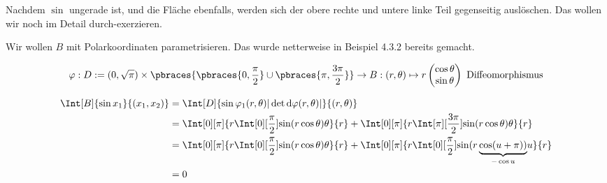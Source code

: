 \begin{solution}
\begin{enumerate}[label = \arabic*.]
\begin{center}
    \end{center}

    Nachdem $\sin$ ungerade ist, und die Fläche ebenfalls, werden sich der obere rechte und untere linke Teil gegenseitig auslöschen.
    Das wollen wir noch im Detail durch-exerzieren.


    Wir wollen $B$ mit Polarkoordinaten parametrisieren.
    Das wurde netterweise in Beispiel 4.3.2 bereits gemacht.

    \begin{align*}
        \varphi:
        D
        :=
        (0, \sqrt \pi)
        \times
        \pbraces
        {
            \pbraces
            {
                0,
                \frac{\pi}{2}
            }
            \cup
            \pbraces
            {
                \pi,
                \frac{3 \pi}{2}
            }
        }
        \to
        B
        :
        (r, \theta)
        \mapsto
        r
        \begin{pmatrix}
            \cos \theta \\ \sin \theta
        \end{pmatrix}
        ~\text{Diffeomorphismus}
    \end{align*}

    \begin{align*}
        \Int[B]
        {
            \sin x_1
        }{(x_1, x_2)}
        & =
        \Int[D]
        {
            \sin \varphi_1(r, \theta)
            |\det \mathrm{d} \varphi(r, \theta)|
        }{(r, \theta)} \\
        & =
        \Int[0][\pi]
        {
            r
            \Int[0][\frac{\pi}{2}]
            {
                \sin(r \cos \theta)
            }{\theta}
        }{r}
        +
        \Int[0][\pi]
        {
            r
            \Int[\pi][\frac{3 \pi}{2}]
            {
                \sin(r \cos \theta)
            }{\theta}
        }{r} \\
        & =
        \Int[0][\pi]
        {
            r
            \Int[0][\frac{\pi}{2}]
            {
                \sin(r \cos \theta)
            }{\theta}
        }{r}
        +
        \Int[0][\pi]
        {
            r
            \Int[0][\frac{\pi}{2}]
            {
                \sin
                (
                    r
                    \underbrace
                    {
                        \cos(u + \pi))
                    }_{
                        -\cos u
                    }
            }{u}
        }{r} \\
        & =
        0
    \end{align*}


\end{enumerate}
\end{solution}
